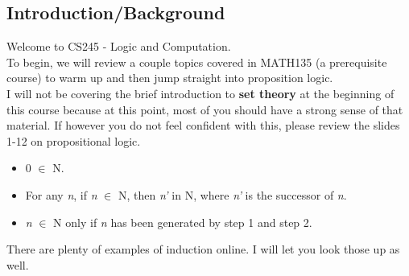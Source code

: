 
\subsection{Introduction/Background}

Welcome to CS245 - Logic and Computation.\\

To begin, we will review a couple topics covered in MATH135 (a prerequisite course) to warm up and then jump straight into proposition logic.\\

I will not be covering the brief introduction to \textbf{set theory} at the beginning of this course because at this point, most of you should have a strong sense of that material.  If however you do not feel confident with this, please review the slides 1-12 on propositional logic.\\



\begin{itemize}
\item 0 $\in$ N.
\item For any \emph{n}, if \emph{n} $\in$ N, then \emph{n'} in N, where \emph{n'} is the successor of \emph{n}.
\item \emph{n} $\in$ N only if \emph{n} has been generated by step 1 and step 2.
\end{itemize}

There are plenty of examples of induction online.  I will let you look those up as well.\\



